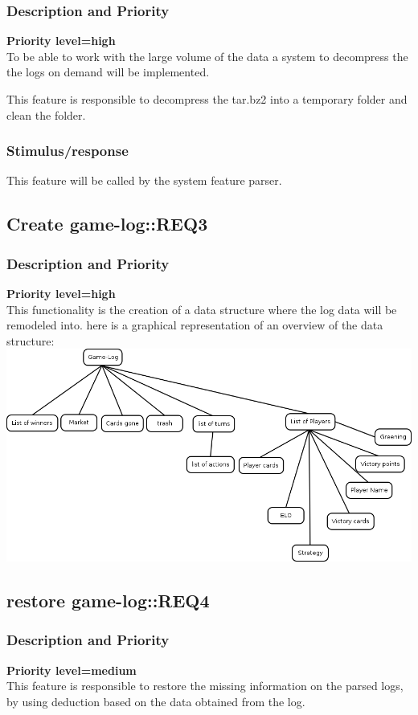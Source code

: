 \documentclass{scrreprt}
\begin{document}
\subsubsection{Description and Priority}
\textbf{Priority level=high}\\

To be able to work with the large volume of the data a system to decompress the
the logs on demand will be implemented.

This feature is responsible to decompress the tar.bz2 into a temporary folder
and clean the folder.

\subsubsection{Stimulus/response}
This feature will be called by the system feature parser.


\subsection{Create game-log::REQ3}
\subsubsection{Description and Priority}
\textbf{Priority level=high}\\
This functionality is the creation of a data structure where the log data will
be remodeled into.
here is a graphical representation of an overview of the data structure:
\includegraphics[scale=0.5,keepaspectratio]{game-log}


\subsection{restore game-log::REQ4}
\subsubsection{Description and Priority}
\textbf{Priority level=medium}\\
This feature is responsible to restore the missing information on the parsed
logs, by using deduction based on the data obtained from the log.
\end{document}
